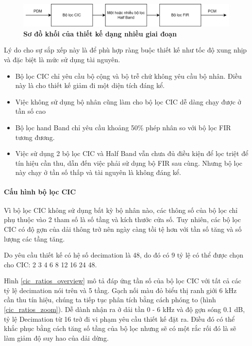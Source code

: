 \begin{figure}[H]
    \centering
    \includegraphics[width=15cm]{Images/Chuong3/pipeline_top.png}
    \caption[Sơ đồ khối của thiết kế dạng nhiều giai đoạn]{\bfseries \fontsize{12pt}{0pt}\selectfont Sơ đồ khối của thiết kế dạng nhiều giai đoạn}
    \label{pipeline_top}
\end{figure}
Lý do cho sự sắp xếp này là để phù hợp ràng buộc thiết kế như tốc độ xung nhịp và đặc biệt là mức sử dụng tài nguyên.
\begin{itemize}
    \item Bộ lọc CIC chỉ yêu cầu bộ cộng và bộ trễ chứ không yêu cầu bộ nhân. Điều này là cho thiết kế giảm đi một diện tích đáng kể.
    \item Việc không sử dụng bộ nhân cũng làm cho bộ lọc CIC dễ dàng chạy được ở tần số cao
    \item Bộ lọc hand Band chỉ yêu cầu khoảng 50\% phép nhân so với bộ lọc FIR tương đương.
    \item Việc sử dụng 2 bộ lọc CIC và Half Band vẫn chưa đủ điều kiện để lọc triệt để tín hiệu cần thu, dẫn đến việc phải sử dụng bộ FIR sau cùng. Nhưng bộ lọc này chạy ở tần số thấp và tài nguyên là không đáng kể.
\end{itemize}
\paragraph{Cấu hình bộ lọc CIC}
Vì bộ lọc CIC không sử dụng bất kỳ bộ nhân nào, các thông số của bộ lọc chỉ phụ thuộc vào 2 tham số là số tầng và kích thước cửa số. Tuy nhiên, các bộ lọc CIC có độ gợn của dải thông trở nên ngày càng tồi tệ hơn với tần số tăng và số lượng các tầng tăng.

Do yêu cầu thiết kế có hệ số decimation là 48, do đó có 9 tỷ lệ có thể được chọn cho CIC: 2 3 4 6 8 12 16 24 48.

Hình \ref{cic_ratios_overview} mô tả đáp ứng tần số của bộ lọc CIC với tất cả các tỷ lệ decimation nói trên và 5 tầng. Gạch nối màu đỏ biểu thị ranh giới 6 kHz cần thu tín hiệu, chúng ta tiếp tục phân tích bằng cách phóng to (hình \ref{cic_ratios_zoom}). Dễ dành nhận ra ở dải tần 0 - 6 kHz và độ gợn sóng 0.1 dB, tỷ lệ Decimation từ 16 trở đi vi phạm yêu cầu thiết kế đặt ra. Điều đó có thể khắc phục bằng cách tăng số tầng của bộ lọc nhưng sẽ có một rắc rối đó là sẽ làm giảm độ suy hao của dải dừng.

